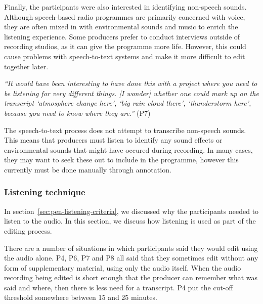 

Finally, the participants were also interested in identifying non-speech sounds. Although speech-based radio programmes
are primarily concerned with voice, they are often mixed in with environmental sounds and music to enrich the listening
experience. Some producers prefer to conduct interviews outside of recording studios, as it can give the
programme more life. However, this could cause problems with speech-to-text systems and make it more difficult to edit
together later.


\textit{``It would have been interesting to have done this with a project where you need to be listening for very
  different things. [I wonder] whether one could mark up on the transcript `atmosphere change here', `big rain cloud
there', `thunderstorm here', because you need to know where they are.''} (P7)

The speech-to-text process does not attempt to transcribe non-speech sounds. This means that producers must listen to
identify any sound effects or environmental sounds that might have occured during recording. In many cases, they may
want to seek these out to include in the programme, however this currently must be done manually through annotation.

\subsubsection{Listening technique}

In section~\ref{sec:pen-listening-criteria}, we discussed why the participants needed to listen to the audio. In this
section, we discuss how listening is used as part of the editing process.


There are a number of situations in which participants said they would edit using the audio alone. P4, P6, P7 and P8
all said that they sometimes edit without any form of supplementary material, using only the audio itself. When
the audio recording being edited is short enough that the producer can remember what was said and where, then
there is less need for a transcript. P4 put the cut-off threshold somewhere between 15 and 25 minutes.


